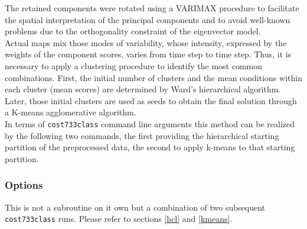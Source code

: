 \documentclass[12pt, oneside, a4paper, headsepline, plainheadsepline]{scrbook}
\begin{document}
The retained components were rotated using a VARIMAX procedure to facilitate the spatial interpretation of the principal components and to avoid well-known problems due to the orthogonality constraint of the eigenvector model.\\
Actual maps mix those modes of variability, whose intensity, expressed by the weights of the component scores, varies from time step to time step. Thus, it is necessary to apply a clustering procedure to identify the most common combinations. First, the initial number of clusters and the mean conditions within each cluster (mean scores) are determined by Ward's hierarchical algorithm. Later, those initial clusters are used as seeds to obtain the final solution through a K-means agglomerative algorithm.\\
In terms of \verb+cost733class+ command line arguments this method can be realized by the following two commands, the first providing the hierarchical starting partition of the preprocessed data, the second to apply k-means to that starting partition.\\

\subsubsection*{Options}
This is not a subroutine on it own but a combination of two subsequent \verb+cost733class+ runs. Please refer to sections \ref{hcl} and \ref{kmeans}.
\end{document}
